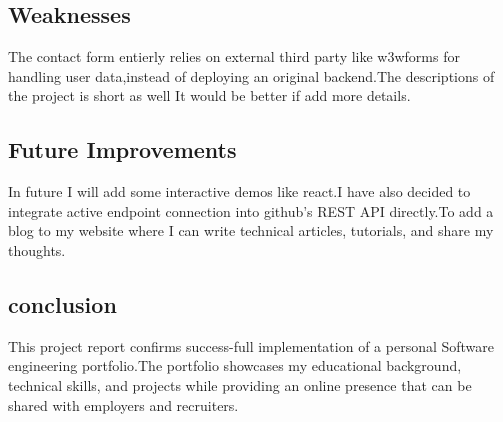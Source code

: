 \documentclass {article}
\begin{document}
\subsection{Weaknesses}
The contact form entierly relies on external third party like w3wforms for handling user data,instead of deploying an original backend.The descriptions of the project is short as well It would be better if add more details.

\subsection{Future Improvements}
In future I will add some interactive demos like react.I have also decided to integrate active endpoint connection into github's REST API directly.To add a blog to my website where I can write technical articles, tutorials, and share my thoughts.

\subsection{conclusion}
This project report confirms success-full implementation of a personal Software engineering portfolio.The portfolio showcases my educational background, technical skills, and projects while providing an online presence that can be shared with employers and recruiters.
\end{document}
